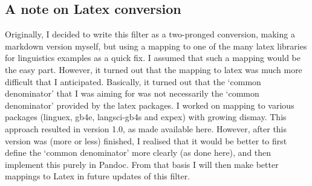 \documentclass[
]{article}
\begin{document}
\hypertarget{a-note-on-latex-conversion}{%
\subsection{A note on Latex
conversion}\label{a-note-on-latex-conversion}}

Originally, I decided to write this filter as a two-pronged conversion,
making a markdown version myself, but using a mapping to one of the many
latex libraries for linguistics examples as a quick fix. I assumed that
such a mapping would be the easy part. However, it turned out that the
mapping to latex was much more difficult that I anticipated. Basically,
it turned out that the `common denominator' that I was aiming for was
not necessarily the `common denominator' provided by the latex packages.
I worked on mapping to various packages (linguex, gb4e, langsci-gb4s and
expex) with growing dismay. This approach resulted in version 1.0, as
made available here. However, after this version was (more or less)
finished, I realised that it would be better to first define the `common
denominator' more clearly (as done here), and then implement this purely
in Pandoc. From that basis I will then make better mappings to Latex in
future updates of this filter.
\end{document}
